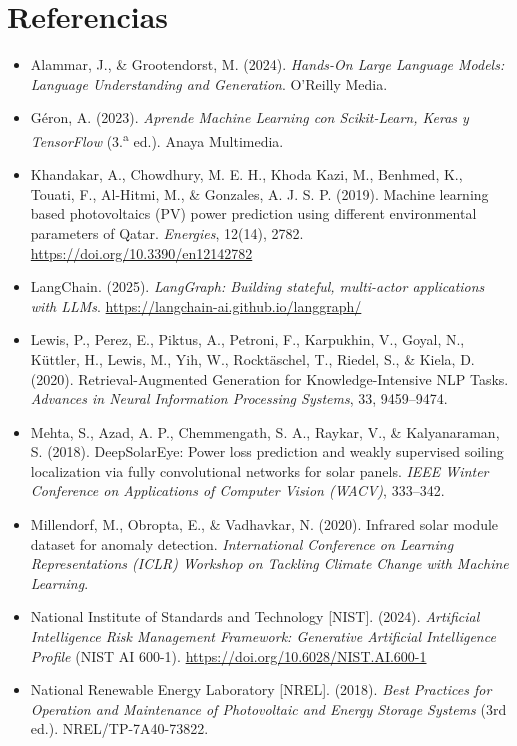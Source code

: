 \documentclass[12pt,a4paper]{article}
\begin{document}
\section*{Referencias}
\begin{itemize}
    \item Alammar, J., \& Grootendorst, M. (2024). \textit{Hands-On Large Language Models: Language Understanding and Generation}. O'Reilly Media.
    \item Géron, A. (2023). \textit{Aprende Machine Learning con Scikit-Learn, Keras y TensorFlow} (3.\textsuperscript{a} ed.). Anaya Multimedia.
    \item Khandakar, A., Chowdhury, M. E. H., Khoda Kazi, M., Benhmed, K., Touati, F., Al-Hitmi, M., \& Gonzales, A. J. S. P. (2019). Machine learning based photovoltaics (PV) power prediction using different environmental parameters of Qatar. \textit{Energies}, 12(14), 2782. \url{https://doi.org/10.3390/en12142782}
    \item LangChain. (2025). \textit{LangGraph: Building stateful, multi-actor applications with LLMs}. \url{https://langchain-ai.github.io/langgraph/}
    \item Lewis, P., Perez, E., Piktus, A., Petroni, F., Karpukhin, V., Goyal, N., Küttler, H., Lewis, M., Yih, W., Rocktäschel, T., Riedel, S., \& Kiela, D. (2020). Retrieval-Augmented Generation for Knowledge-Intensive NLP Tasks. \textit{Advances in Neural Information Processing Systems}, 33, 9459--9474.
    \item Mehta, S., Azad, A. P., Chemmengath, S. A., Raykar, V., \& Kalyanaraman, S. (2018). DeepSolarEye: Power loss prediction and weakly supervised soiling localization via fully convolutional networks for solar panels. \textit{IEEE Winter Conference on Applications of Computer Vision (WACV)}, 333--342.
    \item Millendorf, M., Obropta, E., \& Vadhavkar, N. (2020). Infrared solar module dataset for anomaly detection. \textit{International Conference on Learning Representations (ICLR) Workshop on Tackling Climate Change with Machine Learning}.
    \item National Institute of Standards and Technology [NIST]. (2024). \textit{Artificial Intelligence Risk Management Framework: Generative Artificial Intelligence Profile} (NIST AI 600-1). \url{https://doi.org/10.6028/NIST.AI.600-1}
    \item National Renewable Energy Laboratory [NREL]. (2018). \textit{Best Practices for Operation and Maintenance of Photovoltaic and Energy Storage Systems} (3rd ed.). NREL/TP-7A40-73822.
\end{itemize}
\end{document}
